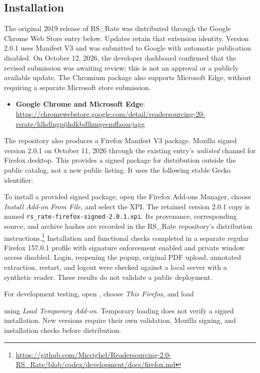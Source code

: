 \documentclass[a4paper, english]{article}
\newcommand{\rsrate}{RS\_Rate\xspace}
\begin{document}
\subsection{Installation}

The original 2019 release of \rsrate was distributed through the Google Chrome Web Store entry below. Updates retain that extension identity. Version 2.0.1 uses Manifest V3 and was submitted to Google with automatic publication disabled. On October 12, 2026, the developer dashboard confirmed that the revised submission was awaiting review; this is not an approval or a publicly available update. The Chromium package also supports Microsoft Edge, without requiring a separate Microsoft store submission.
\begin{itemize}
\item \textbf{Google Chrome and Microsoft Edge}: \url{https://chromewebstore.google.com/detail/readersourcing-20-rsrate/hlkdlngpijhdkbdlhmgeemffaoacjagg}
\end{itemize}

The repository also produces a Firefox Manifest V3 package. Mozilla signed version 2.0.1 on October 11, 2026 through the existing entry's \emph{unlisted} channel for Firefox desktop. This provides a signed package for distribution outside the public catalog, not a new public listing. It uses the following stable Gecko identifier:
\begin{center}
\small{}
\end{center}
To install a provided signed package, open the Firefox Add-ons Manager, choose \emph{Install Add-on From File}, and select the XPI. The retained version 2.0.1 copy is named \verb|rs_rate-firefox-signed-2.0.1.xpi|. Its provenance, corresponding source, and archive hashes are recorded in the \rsrate repository's distribution instructions.\footnote{\url{https://github.com/Miccighel/Readersourcing-2.0-RS_Rate/blob/codex/development/docs/firefox.md}} Installation and functional checks completed in a separate regular Firefox 157.0.1 profile with signature enforcement enabled and private window access disabled. Login, reopening the popup, original PDF upload, annotated extraction, restart, and logout were checked against a local server with a synthetic reader. These results do not validate a public deployment.

For development testing, open , choose \emph{This Firefox}, and load
\begin{center}
\small{}
\end{center}
using \emph{Load Temporary Add-on}. Temporary loading does not verify a signed installation. New versions require their own validation, Mozilla signing, and installation checks before distribution.
\end{document}
